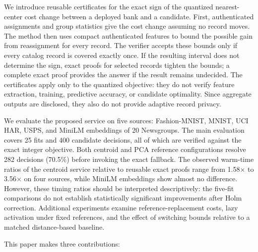 \documentclass[5p,times,twocolumn]{elsarticle}
\begin{document}
We introduce reusable certificates for the exact sign of the
quantized nearest-center cost change between a deployed bank and a
candidate. First, authenticated assignments and group statistics give
the cost change assuming no record moves. The method then uses compact
authenticated features to bound the possible gain from reassignment
for every record. The verifier accepts these bounds only if every
catalog record is covered exactly once. If the resulting interval does
not determine the sign, exact proofs for selected records tighten the
bounds; a complete exact proof provides the answer if the result
remains undecided. The certificates apply only to the quantized
objective: they do not verify feature extraction, training,
predictive accuracy, or candidate optimality. Since aggregate outputs
are disclosed, they also do not provide adaptive record privacy.

We evaluate the proposed service on five sources: Fashion-MNIST, MNIST, UCI HAR, USPS, and MiniLM embeddings of 20 Newsgroups. The main evaluation covers 25 fits and 400 candidate decisions, all of which are verified against the exact integer objective. Both centroid and PCA reference configurations resolve 282 decisions (70.5\%) before invoking the exact fallback. The observed warm-time ratios of the centroid service relative to reusable exact proofs range from 1.58× to 3.56× on four sources, while MiniLM embeddings show almost no difference. However, these timing ratios should be interpreted descriptively: the five-fit comparisons do not establish statistically significant improvements after Holm correction. Additional experiments examine reference-replacement costs, lazy activation under fixed references, and the effect of switching bounds relative to a matched distance-based baseline.

This paper makes three contributions:
\end{document}
